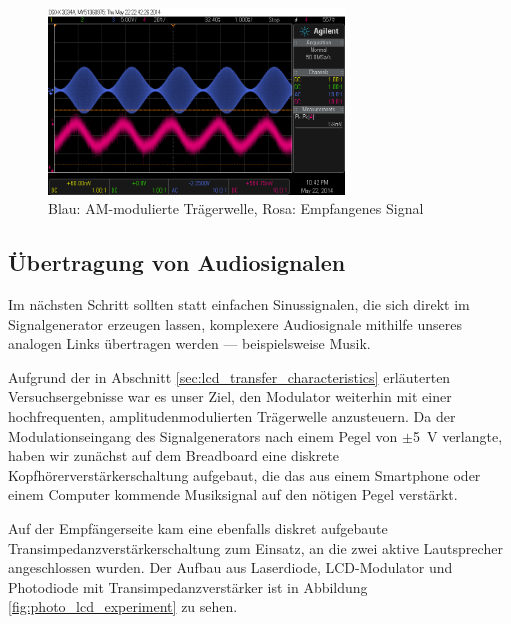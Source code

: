 \documentclass[12pt,a4paper]{article}
\begin{document}
\begin{figure}[H]
  \centering
    \includegraphics[width=0.7\textwidth]{../measurements/20140522_sweep/scope_1.png}
  \caption{Blau: AM-modulierte Trägerwelle, Rosa: Empfangenes Signal}
  \label{fig:amplitude_modulation}
\end{figure}


\subsection{Übertragung von Audiosignalen}

Im nächsten Schritt sollten statt einfachen Sinussignalen, die sich direkt im Signalgenerator erzeugen lassen, komplexere Audiosignale mithilfe unseres analogen Links übertragen werden --- beispielsweise Musik.

Aufgrund der in Abschnitt \ref{sec:lcd_transfer_characteristics} erläuterten Versuchsergebnisse war es unser Ziel, den Modulator weiterhin mit einer hochfrequenten, amplitudenmodulierten Trägerwelle anzusteuern. Da der Modulationseingang des Signalgenerators nach einem Pegel von $\pm$\SI{5}{\volt} verlangte, haben wir zunächst auf dem Breadboard eine diskrete Kopfhörerverstärkerschaltung aufgebaut, die das aus einem Smartphone oder einem Computer kommende Musiksignal auf den nötigen Pegel verstärkt.

Auf der Empfängerseite kam eine ebenfalls diskret aufgebaute Transimpedanzverstärkerschaltung zum Einsatz, an die zwei aktive Lautsprecher angeschlossen wurden. Der Aufbau aus Laserdiode, LCD-Modulator und Photodiode mit Transimpedanzverstärker ist in Abbildung \ref{fig:photo_lcd_experiment} zu sehen.
\end{document}
